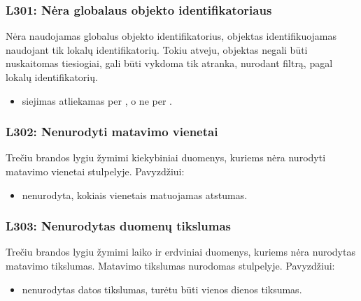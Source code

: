 \documentclass[letterpaper,10pt,lithuanian]{sphinxmanual}
\begin{document}
\subsubsection{L301: Nėra globalaus objekto identifikatoriaus}
\label{\detokenize{branda:l301-nera-globalaus-objekto-identifikatoriaus}}\label{\detokenize{branda:l301}}
\sphinxAtStartPar
Nėra naudojamas globalus objekto identifikatorius, objektas identifikuojamas
naudojant tik lokalų identifikatorių. Tokiu atveju, objektas negali būti
nuskaitomas tiesiogiai, gali būti vykdoma tik atranka, nurodant filtrą, pagal
lokalų identifikatorių.
\begin{itemize}
\item {} 
\sphinxAtStartPar
{} \sphinxhyphen{} siejimas atliekamas per , o ne per
.

\end{itemize}


\subsubsection{L302: Nenurodyti matavimo vienetai}
\label{\detokenize{branda:l302-nenurodyti-matavimo-vienetai}}\label{\detokenize{branda:l302}}
\sphinxAtStartPar
Trečiu brandos lygiu žymimi kiekybiniai duomenys, kuriems nėra nurodyti
matavimo vienetai {\hyperref[\detokenize{dimensijos:property.ref}]{}} stulpelyje. Pavyzdžiui:
\begin{itemize}
\item {} 
\sphinxAtStartPar
{} \sphinxhyphen{} nenurodyta, kokiais vienetais matuojamas atstumas.

\end{itemize}


\subsubsection{L303: Nenurodytas duomenų tikslumas}
\label{\detokenize{branda:l303-nenurodytas-duomenu-tikslumas}}\label{\detokenize{branda:l303}}
\sphinxAtStartPar
Trečiu brandos lygiu žymimi laiko ir erdviniai duomenys, kuriems nėra nurodytas
matavimo tikslumas. Matavimo tikslumas nurodomas  stulpelyje.
Pavyzdžiui:
\begin{itemize}
\item {} 
\sphinxAtStartPar
{} \sphinxhyphen{} nenurodytas datos tikslumas, turėtu būti  \sphinxhyphen{} vienos dienos
tiksumas.

\end{itemize}
\end{document}
